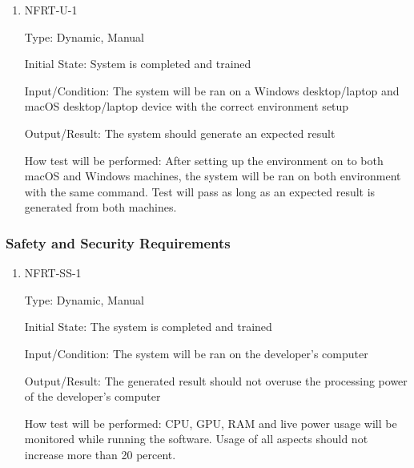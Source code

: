\documentclass[12pt, titlepage]{article}
\begin{document}
\begin{enumerate}

\item{NFRT-U-1\\}

Type: Dynamic, Manual
					
Initial State: System is completed and trained
					
Input/Condition: The system will be ran on a Windows desktop/laptop and macOS desktop/laptop device with the correct environment setup
					
Output/Result: The system should generate an expected result 
					
How test will be performed: After setting up the environment on to both macOS and Windows machines, the system will be ran on both environment with the same command. Test will pass as long as an expected result is generated from both machines.


\end{enumerate}


\subsubsection{Safety and Security Requirements}


\begin{enumerate}

\item{NFRT-SS-1\\}

Type: Dynamic, Manual
					
Initial State: The system is completed and trained 
					
Input/Condition: The system will be ran on the developer's computer
					
Output/Result: The generated result should not overuse the processing power of the developer's computer
					
How test will be performed: CPU, GPU, RAM and live power usage will be monitored while running the software. Usage of all aspects should not increase more than 20 percent.   
					
\end{enumerate}
\end{document}
